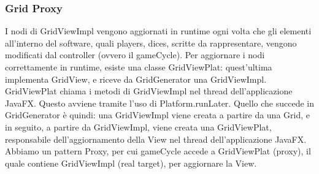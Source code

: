 \documentclass[a4paper,12pt]{report}
\begin{document}
    \subsubsection {Grid Proxy}
	I nodi di GridViewImpl vengono aggiornati in runtime ogni volta che gli elementi all’interno del software, quali players, dices, scritte da rappresentare, vengono modificati dal controller (ovvero il gameCycle).
	Per aggiornare i nodi correttamente in runtime, esiste una classe GridViewPlat: quest'ultima implementa GridView, e riceve da GridGenerator una GridViewImpl.
	GridViewPlat chiama i metodi di GridViewImpl nel thread dell’applicazione JavaFX.
	Questo avviene tramite l’uso di Platform.runLater.
	Quello che succede in GridGenerator è quindi: una GridViewImpl viene creata a partire da una Grid, e in seguito, a partire da GridViewImpl, viene creata una GridViewPlat, responsabile dell’aggiornamento della View nel thread dell’applicazione JavaFX.
	Abbiamo un pattern Proxy, per cui gameCycle accede a GridViewPlat (proxy), il quale contiene GridViewImpl (real target), per aggiornare la View.
\end{document}
